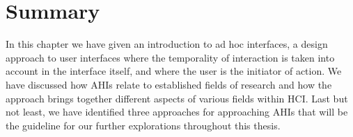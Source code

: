 \section{Summary}

In this chapter we have given an introduction to ad hoc interfaces, a design approach to user interfaces where the temporality of interaction is taken into account in the interface itself, and where the user is the initiator of action.
We have discussed how AHIs relate to established fields of research and how the approach brings together different aspects of various fields within HCI.
Last but not least, we have identified three approaches for approaching AHIs that will be the guideline for our further explorations throughout this thesis.
